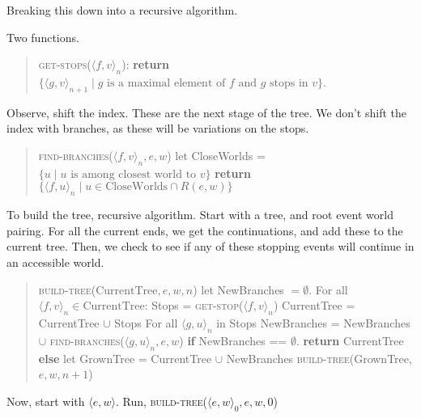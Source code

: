 \begin{note}
  Breaking this down into a recursive algorithm.
\end{note}

\begin{note}
  Two functions.
  \begin{quote}
    \textsc{get-stops}(\(\langle f,v \rangle_{n}\)):\newline
    \mbox{}\indent\textbf{return} \(\{\langle g,v \rangle_{n+1} \mid g \text{ is a maximal element of } f \text{ and } g \text{ stops in } v\}\).
  \end{quote}

  Observe, shift the index.
  These are the next stage of the tree.
  We don't shift the index with branches, as these will be variations on the stops.

  \begin{quote}
    \textsc{find-branches}(\(\langle f,v \rangle_{n}, e, w\))\newline
    let CloseWorlds = \(\{u \mid u \text{ is among closest world to } v\}\)\newline
    \phantom{mm} \textbf{return} \(\{ \langle f,u \rangle_{n} \mid u \in \text{CloseWorlds} \cap R(e,w)\}\)
  \end{quote}

  To build the tree, recursive algorithm.
  Start with a tree, and root event world pairing.
  For all the current ends, we get the continuations, and add these to the current tree.
  Then, we check to see if any of these stopping events will continue in an accessible world.
  

  \begin{quote}
    \textsc{build-tree}(\(\text{CurrentTree}, e, w, n\))\newline
    let NewBranches \(= \emptyset\).\newline
    For all \(\langle f,v \rangle_{n} \in \text{CurrentTree}\):\newline
    \phantom{mm} Stops = \textsc{get-stop}(\(\langle f,v \rangle_{n}\))\newline
    \phantom{mm} CurrentTree = CurrentTree \(\cup\) Stops\newline
    \phantom{mm} For all \(\langle g,u \rangle_{n}\) in Stops\newline
    \phantom{mm}\phantom{mm} NewBranches = NewBranches \(\cup\) \textsc{find-branches}(\(\langle g,u \rangle_{n}, e, w\))\newline
    \textbf{if} NewBranches == \(\emptyset\).\newline
    \phantom{mm} \textbf{return} CurrentTree\newline
    \textbf{else}\newline
    \phantom{mm} let GrownTree = CurrentTree \(\cup\) NewBranches\newline
    \phantom{mm} \textsc{build-tree}(GrownTree, \(e,w, n+1\))\newline
  \end{quote}

  Now, start with \(\langle e,w \rangle\).
  Run, \textsc{build-tree}(\(\langle e,w \rangle_{0}, e, w, 0\))
\end{note}





